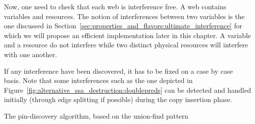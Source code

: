 Now, one need to check that each web is interference free. A web contains variables and resources. The notion of interferences between two variables is the one discussed in Section~\ref{sec:properties_and_flavors:ultimate_interference} for which we will propose an efficient implementation later in this chapter. A variable and a resource do not interfere while two distinct physical resources will interfere with one another.

If any interference have been discovered, it has to be fixed on a case by case basis. Note that some interferences such as the one depicted in Figure~\ref{fig:alternative_ssa_destruction:doublepreds} can be detected and handled initially (through edge splitting if possible) during the copy insertion phase.


\begin{algorithm}
\caption{\label{alg:alternative_ssadestruction_algorithm:find-webs}The pin-\phiwebs discovery algorithm, based on the union-find pattern}
\end{algorithm}
